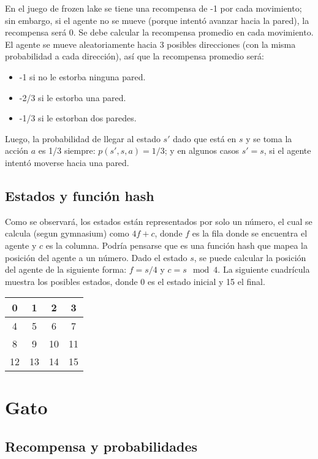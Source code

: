 \documentclass{article}
\begin{document}
En el juego de frozen lake se tiene una recompensa de -1 por cada movimiento; sin embargo, si el agente no se mueve (porque intentó avanzar hacia la pared), la recompensa será 0. Se debe calcular la recompensa promedio en cada movimiento. El agente se mueve aleatoriamente hacia 3 posibles direcciones (con la misma probabilidad a cada dirección), así que la recompensa promedio será:

\begin{itemize}
\item -1 si no le estorba ninguna pared.
\item -2/3 si le estorba una pared.
\item -1/3 si le estorban dos paredes.
\end{itemize}

Luego, la probabilidad de llegar al estado $s'$ dado que está en $s$ y se toma la acción $a$ es 1/3 siempre: $p(s', s, a) = 1/3$; y en algunos casos $s' = s$, si el agente intentó moverse hacia una pared.

\subsection{Estados y función hash}

Como se observará, los estados están representados por solo un número, el cual se calcula (segun gymnasium) como $4f+c$, donde $f$ es la fila donde se encuentra el agente y $c$ es la columna. Podría pensarse que es una función hash que mapea la posición del agente a un número. Dado el estado $s$, se puede calcular la posición del agente de la siguiente forma: $f=s/4$ y $c = s \mod 4$. La siguiente cuadrícula muestra los posibles estados, donde 0 es el estado inicial y 15 el final.

\begin{center}
\begin{tabular}{|c|c|c|c|}
\hline
0 & 1 & 2 & 3 \\ \hline
4 & 5 & 6 & 7 \\ \hline
8 & 9 & 10 & 11 \\ \hline
12 & 13 & 14 & 15 \\ \hline
\end{tabular}
\end{center}

\section{Gato}

\subsection{Recompensa y probabilidades}
\end{document}
